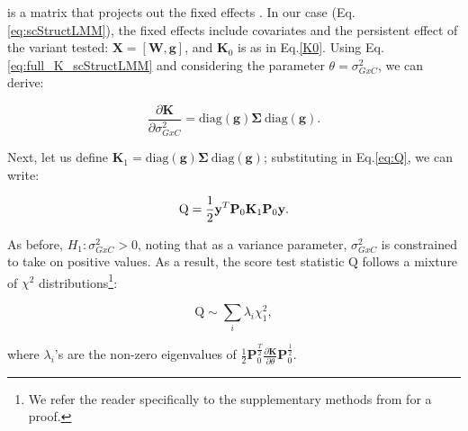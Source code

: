 is a matrix that projects out the fixed effects \cite{lippert2011fast, lippert2014greater}.
In our case (Eq.\eqref{eq:scStructLMM}), the fixed effects include covariates and the persistent effect of the variant tested: $\mathbf{X} = [\mathbf{W}, \mathbf{g}]$, and $\mathbf{K}_0$ is as in Eq.\eqref{K0}.
Using Eq.\eqref{eq:full_K_scStructLMM} and considering the parameter $\theta = \sigma_{GxC}^2$, we can derive:



\begin{equation}
    \frac{\partial \mathbf{K}}{\partial \sigma_{GxC}^2} = \mathrm{diag}(\mathbf{g})\boldsymbol{\Sigma} \ \mathrm{diag}(\mathbf{g}).
\end{equation}

Next, let us define $\mathbf{K}_1 = \mathrm{diag}(\mathbf{g})\boldsymbol{\Sigma} \ \mathrm{diag}(\mathbf{g})$; substituting in Eq.\eqref{eq:Q}, we can write:

\begin{equation}
    \mathrm{Q} = \frac{1}{2}\mathbf{y}^T\mathbf{P}_0 \mathbf{K}_1\mathbf{P}_0 \mathbf{y}. \\
\end{equation}


As before, $H_1: \sigma_{GxC}^2>0$, noting that as a variance parameter, $\sigma_{GxC}^2$ is constrained to take on positive values.
As a result, the score test statistic $\mathrm{Q}$ follows a mixture of $\chi^2$ distributions\footnote{We refer the reader specifically to the supplementary methods from \cite{lippert2014greater} for a proof.}:

\begin{equation}
    \mathrm{Q} \sim \sum_i \lambda_i \chi^2_1, 
\end{equation}

where $\lambda_i$'s are the non-zero eigenvalues of $\frac{1}{2}\mathbf{P}_0^{\frac{T}{2}} \frac{\partial\mathbf{K}}{\partial \theta} \mathbf{P}_0^{\frac{1}{2}}$.\\


